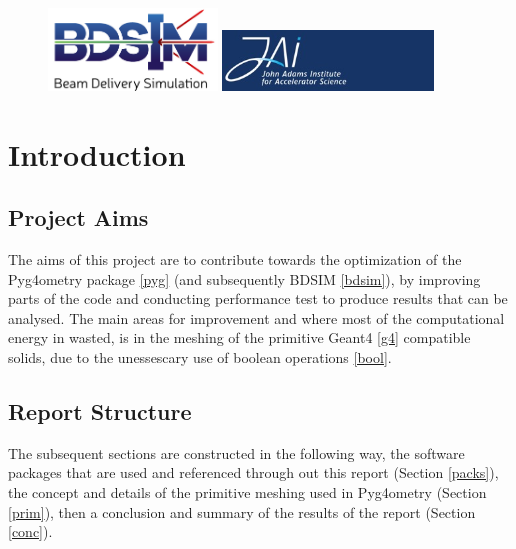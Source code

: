 \documentclass[12pt,a4paper]{article}
\begin{document}
\begin{titlepage}
\begin{figure}[h]
\centering
\begin{minipage}{.6\textwidth}
  \includegraphics[width=0.4\textwidth]{Images//Logos//BDSIM_Logo.jpg}
\end{minipage}%
\begin{minipage}{.6\textwidth}
  \centering
  \includegraphics[width=0.5\textwidth]{Images//Logos//JAI_Logo.jpeg}
  \end{minipage}
\end{figure}

\end{titlepage}
\leavevmode\thispagestyle{empty}\newpage
\tableofcontents
\thispagestyle{empty}
\newpage
\onecolumn

\small
\setcounter{page}{1}


\section{Introduction}

\subsection{Project Aims}
The aims of this project are to contribute towards the optimization of the Pyg4ometry package \ref{pyg} (and subsequently BDSIM \ref{bdsim}), by improving parts of the code and conducting performance test to produce results that can be analysed. The main areas for improvement and where most of the computational energy in wasted, is in the meshing of the primitive Geant4 \ref{g4} compatible solids, due to the unessescary use of boolean operations \ref{bool}.

\subsection{Report Structure}
The subsequent sections are constructed in the following way, the software packages that are used and referenced through out this report (Section \ref{packs}), the concept and details of the primitive meshing used in Pyg4ometry (Section \ref{prim}), then a conclusion and summary of the results of the report (Section \ref{conc}).
\end{document}
